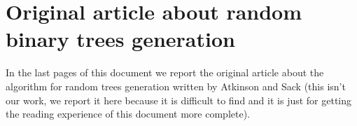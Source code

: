 \documentclass[twoside,openright,titlepage,fleqn,
	headinclude,11pt,a4paper,BCOR5mm,footinclude
	]{scrbook}
\begin{document}
\section{Original article about random binary trees generation}

In the last pages of this document we report the original article
about the algorithm for random trees generation written by Atkinson
and Sack (this isn't our work, we report it here because it is
difficult to find and it is just for getting the reading experience of
this document more complete).



% 

% 
\end{document}
